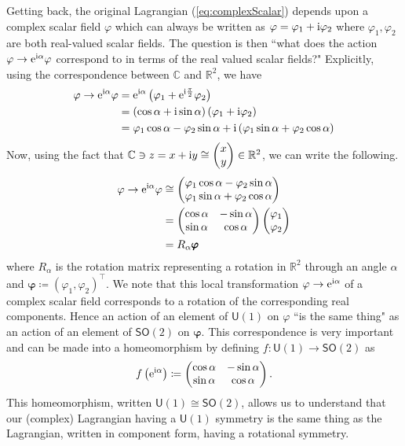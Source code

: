 Getting back, the original Lagrangian (\ref{eq:complexScalar}) depends upon a complex scalar field $\varphi$ which can always be written as $\varphi = \varphi_1 + \mathrm{i}\varphi_2$ where $\varphi_1, \varphi_2$ are both real-valued scalar fields. The question is then ``what does the action $\varphi\to \mathrm{e}^{\mathrm{i}\alpha}\varphi$ correspond to in terms of the real valued scalar fields?" Explicitly, using the correspondence between $\mathbb{C}$ and $\mathbb{R}^2$, we have
\begin{align*}
\varphi \to \mathrm{e}^{\mathrm{i}\alpha}\varphi & = \mathrm{e}^{\mathrm{i}\alpha}\left(\varphi_1 + \mathrm{e}^{\mathrm{i}\frac{\pi}{2}}\varphi_2\right) \\
 & = \left(\cos{\alpha} + \mathrm{i} \sin{\alpha}\right)\left(\varphi_1 + \mathrm{i}\varphi_2\right) \\
 & = \varphi_1\cos{\alpha} - \varphi_2\sin{\alpha} + \mathrm{i}\left(\varphi_1\sin{\alpha} + \varphi_2\cos{\alpha}\right)
 \end{align*}
 Now, using the fact that $\mathbb{C}\ni z = x + \mathrm{i} y\cong \begin{pmatrix}x\\y\end{pmatrix}\in\mathbb{R}^2$, we can write the following.
 \begin{align*}
\varphi\to\mathrm{e}^{\mathrm{i}\alpha}\varphi & \cong \begin{pmatrix} \varphi_1\cos{\alpha} - \varphi_2\sin{\alpha} \\ \varphi_1\sin{\alpha} + \varphi_2\cos{\alpha} \end{pmatrix} \\
 & = \begin{pmatrix} \cos{\alpha} & -\sin{\alpha} \\ \sin{\alpha} & \cos{\alpha} \end{pmatrix}\begin{pmatrix} \varphi_1 \\ \varphi_2 \end{pmatrix} \\
 & = R_\alpha\pmb{\varphi}
\end{align*}
where $R_\alpha$ is the rotation matrix representing a rotation in $\mathbb{R}^2$ through an angle $\alpha$ and $\pmb{\varphi} \coloneqq (\varphi_1, \varphi_2)^\intercal$. We note that this local transformation $\varphi\to\mathrm{e}^{\mathrm{i}\alpha}$ of a complex scalar field corresponds to a rotation of the corresponding real components. Hence an action of an element of $\mathsf{U}(1)$ on $\varphi$ ``is the same thing" as an action of an element of $\mathsf{SO}(2)$ on $\pmb{\varphi}$. This correspondence is very important and can be made into a homeomorphism by defining $f:\mathsf{U}(1)\to \mathsf{SO}(2)$ as
\begin{equation}\label{eq:homeo}
f\left(\mathrm{e}^{\mathrm{i}\alpha}\right)\coloneqq\begin{pmatrix} \cos{\alpha} & -\sin{\alpha} \\ \sin{\alpha} & \cos{\alpha} \end{pmatrix}.
\end{equation}
This homeomorphism, written $\mathsf{U}(1)\cong \mathsf{SO}(2)$, allows us to understand that our (complex) Lagrangian having a $\mathsf{U}(1)$ symmetry is the same thing as the Lagrangian, written in component form, having a rotational symmetry.

